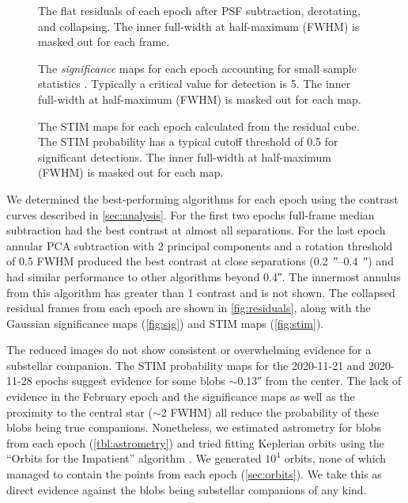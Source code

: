 \documentclass[twocolumn]{aastex631}
\begin{document}
\begin{figure*}
    \centering
    \caption{The flat residuals of each epoch after PSF subtraction, derotating, and collapsing. The inner full-width at half-maximum (FWHM) is masked out for each frame.}
    \label{fig:residuals}
\end{figure*}

\begin{figure*}
    \centering
    \caption{The \textit{significance} maps for each epoch accounting for small sample statistics \citep{mawet_fundamental_2014}. Typically a critical value for detection is 5. The inner full-width at half-maximum (FWHM) is masked out for each map.}
    \label{fig:sig}
\end{figure*}

\begin{figure*}
    \centering
    \caption{The STIM maps for each epoch calculated from the residual cube. The STIM probability has a typical cutoff threshold of 0.5 for significant detections. The inner full-width at half-maximum (FWHM) is masked out for each map.}
    \label{fig:stim}
\end{figure*}

We determined the best-performing algorithms for each epoch using the contrast curves described in \autoref{sec:analysis}. For the first two epochs full-frame median subtraction had the best contrast at almost all separations. For the last epoch annular PCA subtraction with 2 principal components and a rotation threshold of 0.5 FWHM produced the best contrast at close separations (\qtyrange{0.2}{0.4}{\arcsecond}) and had similar performance to other algorithms beyond \ang{;;0.4}. The innermost annulus from this algorithm has greater than 1 contrast and is not shown. The collapsed residual frames from each epoch are shown in \autoref{fig:residuals}, along with the Gaussian significance maps (\autoref{fig:sig}) and STIM maps (\autoref{fig:stim}).

The reduced images do not show consistent or overwhelming evidence for a substellar companion. The STIM probability maps for the 2020-11-21 and 2020-11-28 epochs suggest evidence for some blobs $\sim$\ang{;;0.13} from the center. The lack of evidence in the February epoch and the significance maps as well as the proximity to the central star ($\sim$2 FWHM) all reduce the probability of these blobs being true companions. Nonetheless, we estimated astrometry for blobs from each epoch (\autoref{tbl:astrometry}) and tried fitting Keplerian orbits using the ``Orbits for the Impatient'' algorithm \citep[OFTI;][]{blunt_orbits_2017}. We generated $10^4$ orbits, none of which managed to contain the points from each epoch (\autoref{sec:orbits}). We take this as direct evidence against the blobs being substellar companions of any kind.
\end{document}

